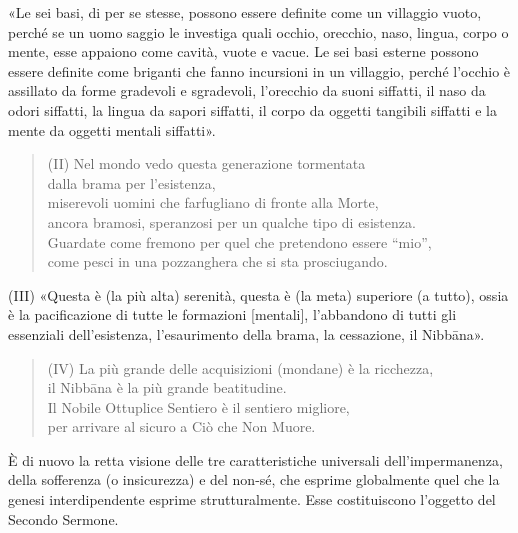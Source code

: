 
\label{pag254}%
«Le sei basi, di per se stesse, possono essere definite come un villaggio vuoto,
perché se un uomo saggio le investiga quali occhio, orecchio, naso, lingua,
corpo o mente, esse appaiono come cavità, vuote e vacue. Le sei basi esterne
possono essere definite come briganti che fanno incursioni in un villaggio,
perché l’occhio è assillato da forme gradevoli e sgradevoli, l’orecchio da suoni
siffatti, il naso da odori siffatti, la lingua da sapori siffatti, il corpo da
oggetti tangibili siffatti e la mente da oggetti mentali siffatti».


\begin{quote}
(II) Nel mondo vedo questa generazione tormentata \\
dalla brama per l’esistenza, \\
miserevoli uomini che farfugliano di fronte alla Morte, \\
ancora bramosi, speranzosi per un qualche tipo di esistenza. \\
Guardate come fremono per quel che pretendono essere “mio”, \\
come pesci in una pozzanghera che si sta prosciugando.
\end{quote}


(III) «Questa è (la più alta) serenità, questa è (la meta) superiore (a tutto),
ossia è la pacificazione di tutte le formazioni [mentali], l’abbandono di tutti
gli essenziali dell’esistenza, l’esaurimento della brama, la cessazione, il
Nibbāna».


\begin{quote}
(IV) La più grande delle acquisizioni (mondane) è la ricchezza, \\
il Nibbāna è la più grande beatitudine. \\
Il Nobile Ottuplice Sentiero è il sentiero migliore, \\
per arrivare al sicuro a Ciò che Non Muore.
\end{quote}


 È di nuovo la retta visione delle tre
caratteristiche universali dell’impermanenza, della sofferenza (o insicurezza) e
del non-sé, che esprime globalmente quel che la genesi interdipendente esprime
strutturalmente. Esse costituiscono l’oggetto del Secondo Sermone.

